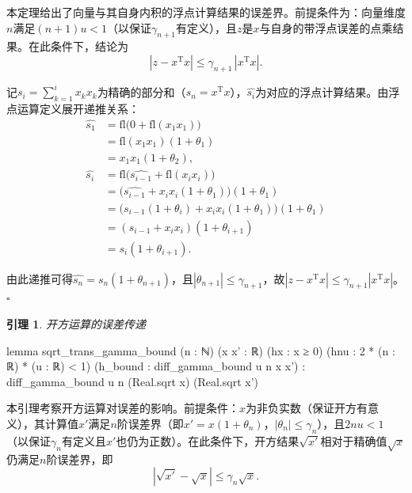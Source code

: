 ﻿\documentclass[UTF8,a4paper,openany]{ctexbook}
\theoremstyle{qrplain}
\newtheorem{lemma}[definition]{引理}
{}
\renewenvironment{proof}[1][证明]
{\par\noindent{\qrthmchinese\bfseries #1. }\ignorespaces}
{\hfill$\square$\par}
\begin{document}
本定理给出了向量与其自身内积的浮点计算结果的误差界。前提条件为：向量维度$n$满足$(n+1)u<1$（以保证$\gamma_{n+1}$有定义），且$z$是$x$与自身的带浮点误差的点乘结果。在此条件下，结论为
$$
|z - x^\mathrm{T}x| \le \gamma_{n+1}\,|x^\mathrm{T}x|.
$$


\begin{proof}
  记$s_i = \sum_{k=1}^i x_kx_k$为精确的部分和（$s_n = x^\mathrm{T}x$），$\widehat{s_i}$为对应的浮点计算结果。由浮点运算定义展开递推关系：
  \begin{align*}
    \widehat{s_1} &= \mathrm{fl}\bigl(0 + \mathrm{fl}(x_1x_1)\bigr) \\
    &= \mathrm{fl}(x_1x_1)(1+\theta_1) \\
    &= x_1x_1(1+\theta_2), \\
    \widehat{s_i} &= \mathrm{fl}\bigl(\widehat{s_{i-1}} + \mathrm{fl}(x_ix_i)\bigr) \\
    &= \bigl(\widehat{s_{i-1}} + x_ix_i(1+\theta_1)\bigr)(1+\theta_1) \\
    &= \bigl(s_{i-1}(1+\theta_i) + x_ix_i(1+\theta_1)\bigr)(1+\theta_1) \\
    &= (s_{i-1} + x_ix_i)(1+\theta_{i+1}) \\
    &= s_i(1+\theta_{i+1}).
  \end{align*}
  
  由此递推可得$\widehat{s_n}=s_n(1+\theta_{n+1})$，且$|\theta_{n+1}|\le\gamma_{n+1}$，故$|z - x^\mathrm{T}x| \le \gamma_{n+1}|x^\mathrm{T}x|$。
\end{proof}

\begin{lemma}
\label{lem:sqrt-bound}
  开方运算的误差传递
\end{lemma}
\begin{leancode}
  lemma sqrt_trans_gamma_bound (n : ℕ) (x x' : ℝ) (hx : x ≥ 0)
    (hnu : 2 * (n : ℝ) * (u : ℝ) < 1) 
    (h_bound : diff_gamma_bound u n x x') :
      diff_gamma_bound u n (Real.sqrt x) (Real.sqrt x') 
\end{leancode}

本引理考察开方运算对误差的影响。前提条件：$x$为非负实数（保证开方有意义），其计算值$x'$满足$n$阶误差界（即$x'=x(1+\theta_n)$，$|\theta_n|\le\gamma_n$），且$2nu<1$（以保证$\gamma_n$有定义且$x'$也仍为正数）。在此条件下，开方结果$\sqrt{x'}$相对于精确值$\sqrt{x}$仍满足$n$阶误差界，即
$$
|\sqrt{x'} - \sqrt{x}| \le \gamma_n \sqrt{x}.
$$
\end{document}
